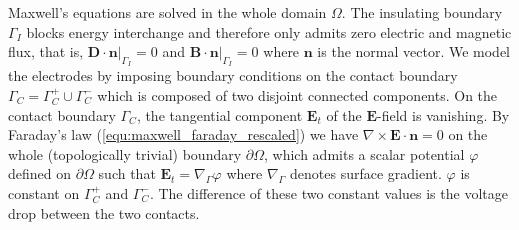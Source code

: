 \documentclass{article}
\begin{document}
Maxwell's equations are solved in the whole domain $\Omega$. The insulating boundary $\Gamma_I$ blocks energy interchange and therefore only admits zero electric and magnetic flux, that is, $\mathbf{D}\cdot \mathbf{n}|_{\Gamma_I} = 0$ and $\mathbf{B} \cdot \mathbf{n}|_{\Gamma_I} = 0$ where $\mathbf{n}$ is the normal vector. We model the electrodes by imposing boundary conditions on the contact boundary $\Gamma_C = \Gamma_C^+\cup \Gamma_C^-$ which is composed of two disjoint connected components. On the contact boundary $\Gamma_C$, the tangential component $\mathbf{E}_t$ of the $\mathbf{E}$-field is vanishing. By Faraday's law (\ref{equ:maxwell_faraday_rescaled}) we have $\nabla \times \mathbf{E} \cdot \mathbf{n} = 0$ on the whole (topologically trivial) boundary $\partial\Omega$, which admits a scalar potential $\varphi$ defined on $\partial\Omega$ such that $\mathbf{E}_t = \nabla_\Gamma \varphi$ where $\nabla_\Gamma$ denotes surface gradient. $\varphi$ is constant on $\Gamma_C^+$ and $\Gamma_C^-$. The difference of these two constant values is the voltage drop between the two contacts.
\end{document}
